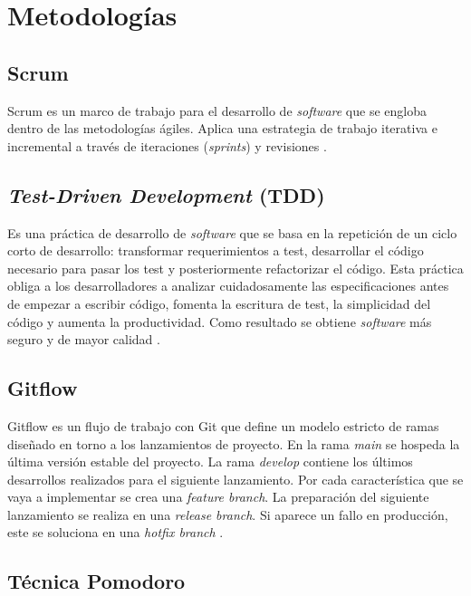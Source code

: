 
\section{Metodologías}\label{metodologias}

\subsection{Scrum}\label{scrum}

Scrum es un marco de trabajo para el desarrollo de \emph{software} que se
engloba dentro de las metodologías ágiles. Aplica una estrategia de
trabajo iterativa e incremental a través de iteraciones (\emph{sprints})
y revisiones \citep{wiki:scrum}.

\subsection{\emph{Test-Driven Development} (TDD)}\label{test-driven-development-tdd}

Es una práctica de desarrollo de \emph{software} que se basa en la repetición
de un ciclo corto de desarrollo: transformar requerimientos a test,
desarrollar el código necesario para pasar los test y posteriormente
refactorizar el código. Esta práctica obliga a los desarrolladores a
analizar cuidadosamente las especificaciones antes de empezar a escribir
código, fomenta la escritura de test, la simplicidad del código y
aumenta la productividad. Como resultado se obtiene \emph{software} más seguro
y de mayor calidad \citep{wiki:tdd}.

\subsection{Gitflow}\label{gitflow}

Gitflow es un flujo de trabajo con Git que define un modelo estricto de ramas
diseñado en torno a los lanzamientos de proyecto. En la rama \emph{main}
se hospeda la última versión estable del proyecto. La rama
\emph{develop} contiene los últimos desarrollos realizados para el
siguiente lanzamiento. Por cada característica que se vaya a implementar
se crea una \emph{feature branch}. La preparación del siguiente
lanzamiento se realiza en una \emph{release branch}. Si aparece un fallo
en producción, este se soluciona en una \emph{hotfix branch} \citep{git:gitflow}.

\subsection{Técnica Pomodoro}\label{pomodoro}

